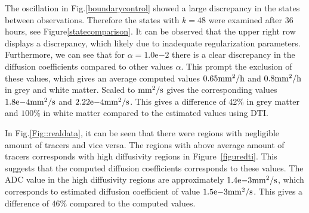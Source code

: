 \documentclass[11pt,a4paper]{article}
\newcommand{\fixme}[1]{\textcolor{orange}{#1}}
\begin{document}
The oscillation in Fig.\ref{boundarycontrol} showed a large discrepancy in the states between observations. Therefore the states with $k=48$ were examined after 36 hours, see Figure\ref{statecomparison}. It can be observed that the upper right row displays a discrepancy, which likely due to inadequate regularization parameters. Furthermore, we can see that for $\alpha=1.0\mathrm{e}{-2}$ there is a clear discrepancy in the diffusion coefficients compared to other values $\alpha$. This prompt the exclusion of these values, which gives an average computed values $ 0.65 \mathrm{mm\sp{2}/h}$ and  $ 0.8 \mathrm{mm\sp{2}/h}$ in grey and white matter. Scaled to $\mathrm{mm\sp{2}/s}$ gives the corresponding values $1.8\mathrm{e}{-4}\mathrm{mm\sp{2}/s}$ and $2.22\mathrm{e}{-4} \mathrm{mm\sp{2}/s}$. This gives a difference of 42\% in grey matter and $ 100 \%$ in white matter compared to the estimated values using DTI.


In Fig.\ref{Fig::realdata}, it can be seen that there were regions with negligible amount of tracers and vice versa. The regions with above average amount of tracers corresponds with high diffusivity regions in Figure~\ref{figuredti}. This suggests that the computed diffusion coefficients corresponds to these values. The ADC value in the high diffusivity regions are approximately  $1.4\mathrm{e}{-3} \mathrm{mm\sp{2}/s}$, which corresponds to estimated diffusion coefficient of value $1.5\mathrm{e}{-3} \mathrm{mm\sp{2}/s}$. This gives a difference of $ 46 \%$ compared to the computed values.


















\end{document}
